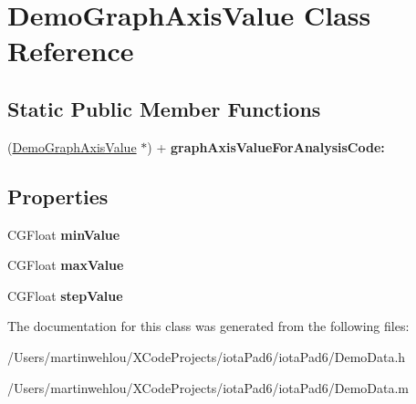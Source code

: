 \hypertarget{interface_demo_graph_axis_value}{
\section{DemoGraphAxisValue Class Reference}
\label{interface_demo_graph_axis_value}
}
\subsection*{Static Public Member Functions}
\begin{DoxyCompactItemize}
\item 
\hypertarget{interface_demo_graph_axis_value_ac51825dedf372f1e63159496fe35fb56}{
(\hyperlink{interface_demo_graph_axis_value}{DemoGraphAxisValue} $\ast$) + {\bfseries graphAxisValueForAnalysisCode:}}
\label{interface_demo_graph_axis_value_ac51825dedf372f1e63159496fe35fb56}

\end{DoxyCompactItemize}
\subsection*{Properties}
\begin{DoxyCompactItemize}
\item 
\hypertarget{interface_demo_graph_axis_value_ad2b8d3770989c2600be832ab249f1ade}{
CGFloat {\bfseries minValue}}
\label{interface_demo_graph_axis_value_ad2b8d3770989c2600be832ab249f1ade}

\item 
\hypertarget{interface_demo_graph_axis_value_ae23dd7ef16bc430dcee2939025aef2fe}{
CGFloat {\bfseries maxValue}}
\label{interface_demo_graph_axis_value_ae23dd7ef16bc430dcee2939025aef2fe}

\item 
\hypertarget{interface_demo_graph_axis_value_a72ba337e5120b44619394d2b837c6452}{
CGFloat {\bfseries stepValue}}
\label{interface_demo_graph_axis_value_a72ba337e5120b44619394d2b837c6452}

\end{DoxyCompactItemize}


The documentation for this class was generated from the following files:\begin{DoxyCompactItemize}
\item 
/Users/martinwehlou/XCodeProjects/iotaPad6/iotaPad6/DemoData.h\item 
/Users/martinwehlou/XCodeProjects/iotaPad6/iotaPad6/DemoData.m\end{DoxyCompactItemize}
